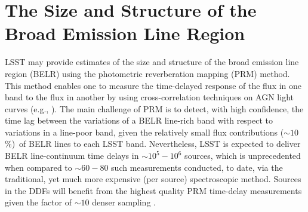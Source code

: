 %
%
%
%
%
%
%

\section{The Size and Structure of the Broad Emission Line Region}
\def\secname{\chpname:photoRM}\label{sec:\secname}




LSST may provide estimates of the size and structure of the broad
emission line region (BELR) using the photometric reverberation
mapping (PRM) method. This method enables one to measure the
time-delayed response of the flux in one band to the flux
in another by using cross-correlation techniques on AGN light
curves (e.g.,
\citealt{CheloucheEtal2014}).
The main challenge of PRM is to detect,
with high confidence, the time lag between the variations of a BELR
line-rich band with respect to variations in a line-poor band, given
the relatively small flux contributions ($\sim10$\%)~of BELR lines to each
LSST band. Nevertheless, LSST is expected to deliver BELR line-continuum
time delays in $\sim10^5-10^6$ sources, which is unprecedented when
compared to $\sim60-80$ such measurements conducted, to date, via the
traditional, yet much more expensive (per source) spectroscopic method.
Sources in the DDFs will benefit from the highest
quality PRM time-delay measurements given the factor of $\sim10$ denser
sampling \citep{CheloucheEtal2014}.

